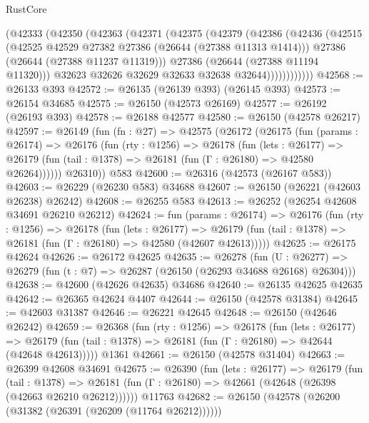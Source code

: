 \begin{lexlean}{RustCore}
\begin{coremodule}
              (@42333
                (@42350
                  (@42363
                    (@42371
                      (@42375
                        (@42379
                          (@42386
                            (@42436
                              (@42515
                                (@42525 @42529 @27382 @27386 (@26644 (@27388 @11313 @1414)))
                                @27386
                                (@26644 (@27388 @11237 @11319)))
                              @27386
                              (@26644 (@27388 @11194 @11320)))
                            @32623
                            @32626
                            @32629
                            @32633
                            @32638
                            @32644))))))))))))
@42568 := @26133 @393
@42572 := @26135 (@26139 @393) (@26145 @393)
@42573 := @26154 @34685
@42575 := @26150 (@42573 @26169)
@42577 := @26192 (@26193 @393)
@42578 := @26188 @42577
@42580 := @26150 (@42578 @26217)
@42597 := @26149
    (fun (fn : @27) =>
    @42575
      (@26172
        (@26175
          (fun (params : @26174) =>
          @26176
            (fun (rty : @1256) =>
            @26178
              (fun (lets : @26177) =>
              @26179 (fun (tail : @1378) => @26181 (fun (Γ : @26180) => @42580 @26264))))))
        @26310))
    @583
@42600 := @26316 (@42573 (@26167 @583))
@42603 := @26229 (@26230 @583) @34688
@42607 := @26150 (@26221 (@42603 @26238) @26242)
@42608 := @26255 @583
@42613 := @26252 (@26254 @42608 @34691 @26210 @26212)
@42624 := fun (params : @26174) =>
  @26176
    (fun (rty : @1256) =>
    @26178
      (fun (lets : @26177) =>
      @26179 (fun (tail : @1378) => @26181 (fun (Γ : @26180) => @42580 (@42607 @42613)))))
@42625 := @26175 @42624
@42626 := @26172 @42625
@42635 := @26278
    (fun (U : @26277) => @26279 (fun (t : @7) => @26287 (@26150 (@26293 @34688 @26168) @26304)))
@42638 := @42600 (@42626 @42635) @34686
@42640 := @26135 @42625 @42635
@42642 := @26365 @42624 @4407
@42644 := @26150 (@42578 @31384)
@42645 := @42603 @31387
@42646 := @26221 @42645
@42648 := @26150 (@42646 @26242)
@42659 := @26368
    (fun (rty : @1256) =>
    @26178
      (fun (lets : @26177) =>
      @26179 (fun (tail : @1378) => @26181 (fun (Γ : @26180) => @42644 (@42648 @42613)))))
    @1361
@42661 := @26150 (@42578 @31404)
@42663 := @26399 @42608 @34691
@42675 := @26390
    (fun (lets : @26177) =>
    @26179
      (fun (tail : @1378) =>
      @26181 (fun (Γ : @26180) => @42661 (@42648 (@26398 (@42663 @26210 @26212))))))
    @11763
@42682 := @26150 (@42578 (@26200 (@31382 (@26391 (@26209 (@11764 @26212))))))

\end{coremodule}
\end{lexlean}
